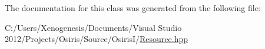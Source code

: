 The documentation for this class was generated from the following file\-:\begin{DoxyCompactItemize}
\item 
C\-:/\-Users/\-Xenogenesis/\-Documents/\-Visual Studio 2012/\-Projects/\-Osiris/\-Source/\-Osiris\-I/\hyperlink{_resource_8hpp}{Resource.\-hpp}\end{DoxyCompactItemize}

